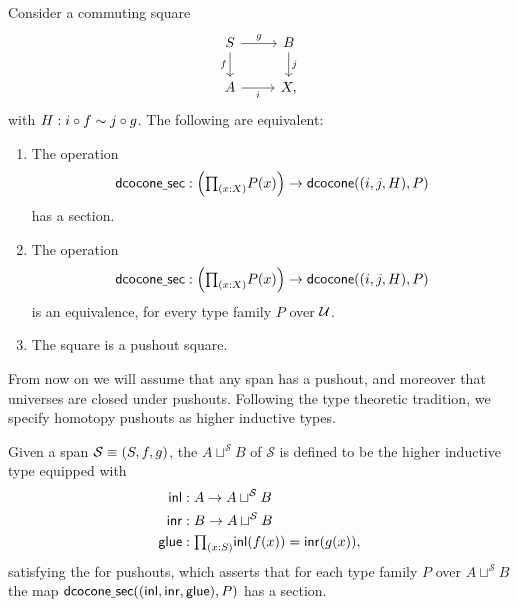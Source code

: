 \begin{thm}\label{thm:pushout_hit}
Consider a commuting square
\begin{equation*}
\begin{tikzcd}
S \arrow[r,"g"] \arrow[d,swap,"f"] & B \arrow[d,"j"] \\
A \arrow[r,swap,"i"] & X,
\end{tikzcd}
\end{equation*}
with $H:i\circ f\sim j\circ g$. The following are equivalent:
\begin{enumerate}
\item The operation
\begin{equation*}
\mathsf{dcocone\usc{}sec}:\Big(\prd{x:X}P(x)\Big)\to \mathsf{dcocone}((i,j,H),P)
\end{equation*}
has a section.
\item The operation
\begin{equation*}
\mathsf{dcocone\usc{}sec}:\Big(\prd{x:X}P(x)\Big)\to \mathsf{dcocone}((i,j,H),P)
\end{equation*}
is an equivalence, for every type family $P$ over $\mathcal{U}$.
\item The square is a pushout square.
\end{enumerate}
\end{thm}

From now on we will assume that any span has a pushout, and moreover that universes are closed under pushouts.
Following the type theoretic tradition, we specify homotopy pushouts as higher inductive types.

\begin{defn}
Given a span $\mathcal{S}\equiv (S,f,g)$, the  $A\sqcup^{\mathcal{S}} B$ of $\mathcal{S}$ is defined to be the higher inductive type equipped with
\begin{align*}
\inl & : A \to A \sqcup^{\mathcal{S}} B \\
\inr & : B \to A \sqcup^{\mathcal{S}} B \\
\glue & : \prd{x:S} \inl(f(x))=\inr(g(x)),
\end{align*}
satisfying the  for pushouts, which asserts that for each type family $P$ over $A\sqcup^{\mathcal{S}} B$ the map $\mathsf{dcocone\underline{\ }{}sec}(({\mathsf{inl}},{\mathsf{inr}},\mathsf{glue}),P)$ has a section.
\end{defn}

